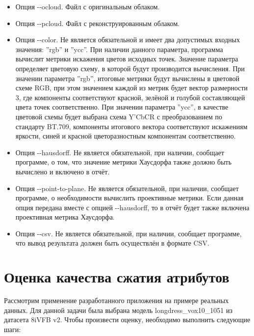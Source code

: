 \begin{itemize}
    \item Опция -{}-ocloud. Файл с оригинальным облаком.
    \item Опция -{}-pcloud. Файл с реконструированным облаком.
    \item Опция -{}-color. Не является обязательной и имеет два допустимых входных
    значения: ''rgb'' и ''ycc''. При наличии данного параметра, программа
    вычислит метрики искажения цветов исходных точек. Значение параметра
    определяет цветовую схему, в которой будут производится вычисления. При
    значении параметра ''rgb'', итоговые метрики будут вычислены в цветовой
    схеме RGB, при этом значением каждой из метрик будет вектор размерности 3,
    где компоненты соответствуют красной, зелёной и голубой составляющей цвета
    точек соответственно. При значении параметра ''ycc'', в качестве цветовой
    схемы будет выбрана схема Y'CbCR с преобразованием по стандарту BT.709,
    компоненты итогового вектора соответствуют искажениям яркости, синей и
    красной цветоразностным компонентам соответственно.
    \item Опция -{}-hausdorff. Не является обязательной, при наличии, сообщает
    программе, о том, что значение метрики Хаусдорфа также должно быть вычислено
    и включено в отчёт.
    \item Опция -{}-point-to-plane. Не является обязательной, при наличии,
    сообщает программе, о необходимости вычислить проективные метрики. Если
    данная опция передана вместе с опцией -{}-hausdorff, то в отчёт будет также
    включена проективная метрика Хаусдорфа.
    \item Опция -{}-csv. Не является обязательной, при наличии, сообщает
    программе, что вывод результата должен быть осуществлён в формате CSV.
\end{itemize}


\section{Оценка качества сжатия атрибутов}

Рассмотрим применение разработанного приложения на примере реальных данных. Для
данной задачи была выбрана модель longdress\_vox10\_1051 из датасета 8iVFB
v2\cite{LongdressDataset}. Чтобы произвести оценку, необходимо выполнить
следующие шаги:

